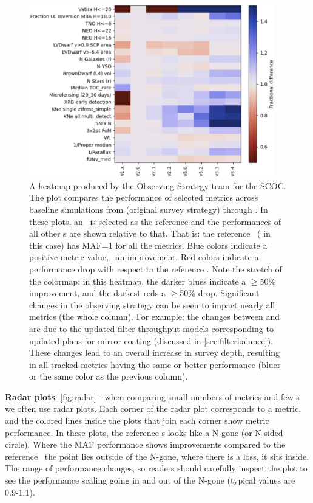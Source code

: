 \begin{figure}
  \centering
    \includegraphics[width=0.95\textwidth]{figures/v1-v34heatmap.png}
\caption{A heatmap produced by the Observing Strategy team for the SCOC. The plot compares the performance of selected metrics across baseline simulations from  (original survey strategy) through . In these plots, an \opsim\ is selected as the reference and the performances of all other \opsim s are shown relative to that. That is: the reference \opsim\ ( in this case) has MAF=1 for all the metrics. Blue colors indicate a positive metric value, \ie\ an improvement. Red colors indicate a performance drop with respect to the reference \opsim. Note the stretch of the colormap: in this heatmap, the darker blues indicate a \mbox{$\geq$50\%} improvement, and the darkest reds a \mbox{$\geq$50\%} drop. Significant changes in the observing strategy can be seen to impact nearly all metrics (the whole column). For example: the changes between  and  are due to the updated filter throughput models corresponding to updated plans for mirror coating (discussed in \autoref{sec:filterbalance}). These changes lead to an overall increase in survey depth, resulting in all tracked metrics having the same or better performance (bluer or the same color as the previous column).}
\label{fig:heatmap}
\end{figure}


\FloatBarrier

{\bf Radar plots}: \autoref{fig:radar} - when comparing small numbers of metrics and few \opsim s we often use radar plots. Each corner of the radar plot corresponds to a metric, and the colored lines inside the plots that join each corner show metric performance. In these plots, the reference \opsim s looks like a N-gone (or N-sided circle). Where the MAF performance shows improvements compared to the reference \opsim\ the point lies outside of the N-gone, where there is a loss, it sits inside. The range of performance changes, so readers should carefully inspect the plot to see the performance scaling going in and out of the N-gone (typical values are 0.9-1.1). 

